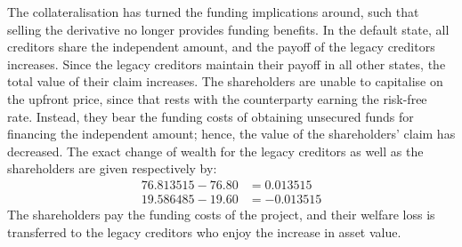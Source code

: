 \documentclass[main.tex]{subfiles}
\begin{document}
        The collateralisation has turned the funding implications around,
        such that selling the derivative no longer provides funding benefits.
        In the default state, all creditors share the independent amount,
        and the payoff of the legacy creditors increases. 
        Since the legacy creditors maintain their payoff in all other states,
        the total value of their claim increases.
        The shareholders are unable to capitalise on the upfront price,
        since that rests with the counterparty earning the risk-free rate.
        Instead, they bear the funding costs of obtaining unsecured funds 
        for financing the independent amount;
        hence, the value of the shareholders' claim has decreased.
        The exact change of wealth for the legacy creditors as well as the shareholders 
        are given respectively by:
            \begin{align*}
                \num{76.813515} - \num{76.80} &= \num{0.013515}\\
                \num{19.586485} - \num{19.60} &= \num{-0.013515}
            \end{align*}
        The shareholders pay the funding costs of the project,
        and their welfare loss is transferred to the legacy creditors
        who enjoy the increase in asset value.
\end{document}
